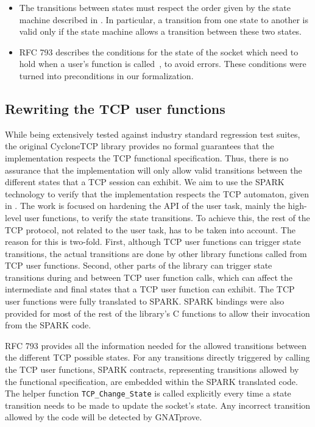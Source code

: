 \documentclass[conference]{IEEEtran}
\begin{document}
\begin{itemize}
\item The transitions between states must respect the order given by the
state machine described in . In particular, a transition from one state to another is valid only if the state machine allows a transition between these two states.
\item RFC 793 describes the conditions for the state of the socket which need to hold when a user's function is called~\cite[p. 52]{rfc793}, to avoid errors. These conditions were turned into preconditions in our formalization.
\end{itemize}

\subsection{Rewriting the TCP user functions}

While being extensively tested against industry standard regression test suites, the original CycloneTCP library provides no formal guarantees that the implementation respects the TCP functional specification. Thus, there is no assurance that the implementation will only allow valid transitions between the different states that a TCP session can exhibit. We aim to use the SPARK technology to verify that the implementation respects the TCP automaton, given in . The work is focused on hardening the API of the user task, mainly the high-level user functions, to verify the state transitions. To achieve this, the rest of the TCP protocol, not related to the user task, has to be taken into account. The reason for this is two-fold. First, although TCP user functions can trigger state transitions, the actual transitions are done by other library functions called from TCP user functions. Second, other parts of the library can trigger state transitions during and between TCP user function calls, which can affect the intermediate and final states that a TCP user function can exhibit. The TCP user functions were fully translated to SPARK. SPARK bindings were also provided for most of the rest of the library's C functions to allow their invocation from the SPARK code.

RFC 793 provides all the information needed for the allowed transitions between the different TCP possible states. For any transitions directly triggered by calling the TCP user functions, SPARK contracts, representing transitions allowed by the functional specification, are embedded within the SPARK translated code. The helper function \texttt{TCP\_Change\_State} is called explicitly every time a state transition needs to be made to update the socket's state. Any incorrect transition allowed by the code will be detected by GNATprove.
\end{document}
